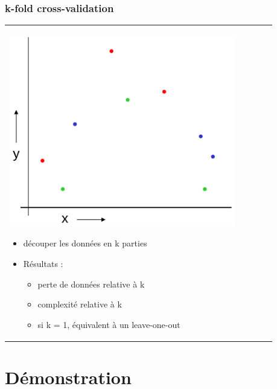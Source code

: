 \documentclass[handout]{beamer}
\begin{document}
		\begin{frame}
		\frametitle{k-fold cross-validation}
		\begin{tabular}{l l}
			\begin{minipage}{0.5\textwidth}
				\begin{center}
					\includegraphics[width=0.9\textwidth]{images/k-fold.png}
				\end{center}
			\end{minipage}

			\begin{minipage}{0.5\textwidth}
				\begin{itemize}
					\item découper les données en k parties
					\item Résultats :
					\begin{itemize}
						\item perte de données relative à k
						\item complexité relative à k
						\item si k = 1, équivalent à un leave-one-out
					\end{itemize}
				\end{itemize}
			\end{minipage}

		\end{tabular}
		\end{frame}

	\section{Démonstration}
\end{document}
